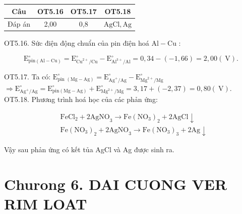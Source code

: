 \documentclass[10pt]{article}
\begin{document}
\begin{center}
\begin{tabular}{|c|c|c|c|}
\hline
Câu & OT5.16 & OT5.17 & OT5.18 \\
\hline
Đáp án & 2,00 & 0,8 & $\mathrm{AgCl}, \mathrm{Ag}$ \\
\hline
\end{tabular}
\end{center}

OT5.16. Sức điện động chuẩn của pin điện hoá $\mathrm{Al}-\mathrm{Cu}$ :

$$
\mathrm{E}_{\mathrm{pin}(\mathrm{Al}-\mathrm{Cu})}^{\circ}=\mathrm{E}_{\mathrm{Cu}^{2+} / \mathrm{Cu}}^{\circ}-\mathrm{E}_{\mathrm{Al}^{3+} / \mathrm{Al}}^{\circ}=0,34-(-1,66)=2,00(\mathrm{~V}) .
$$

OT5.17. Ta có: $\mathrm{E}_{\text {pin }(\mathrm{Mg}-\mathrm{Ag})}^{\circ}=\mathrm{E}_{\mathrm{Ag}^{+} / \mathrm{Ag}}^{\circ}-\mathrm{E}_{\mathrm{Mg}^{2+} / \mathrm{Mg}}^{\circ}$\\
$\Rightarrow \mathrm{E}_{\mathrm{Ag}^{+} / \mathrm{Ag}}^{\circ}=\mathrm{E}_{\mathrm{pin}(\mathrm{Mg}-\mathrm{Ag})}^{\circ}+\mathrm{E}_{\mathrm{Mg}^{2+} / \mathrm{Mg}}^{\circ}=3,17+(-2,37)=0,80(\mathrm{~V})$.\\
OT5.18. Phương trình hoá học của các phản ứng:

$$
\begin{aligned}
& \mathrm{FeCl}_{2}+2 \mathrm{AgNO}_{3} \rightarrow \mathrm{Fe}\left(\mathrm{NO}_{3}\right)_{2}+2 \mathrm{AgCl} \downarrow \\
& \mathrm{Fe}\left(\mathrm{NO}_{3}\right)_{2}+2 \mathrm{AgNO}_{3} \rightarrow \mathrm{Fe}\left(\mathrm{NO}_{3}\right)_{3}+2 \mathrm{Ag} \downarrow
\end{aligned}
$$

Vậy sau phản ứng có kết tủa AgCl và Ag được sinh ra.

\section*{Churong 6. DAI CUONG VER RIM LOAT}
\end{document}
